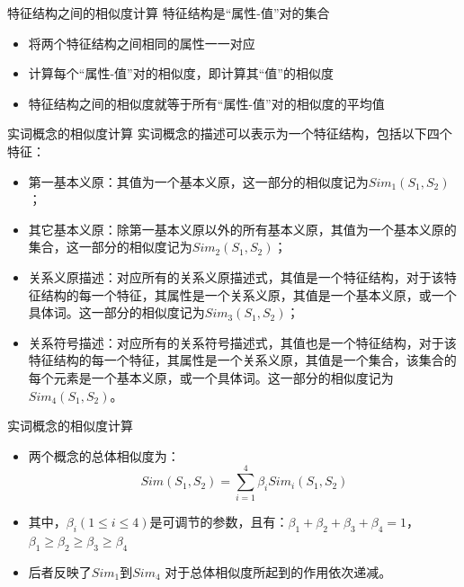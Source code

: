 \documentclass{beamer}
\begin{document}
    \begin{frame}{特征结构之间的相似度计算}
      特征结构是“属性-值”对的集合
      \begin{itemize}
        \item 将两个特征结构之间相同的属性一一对应
        \item 计算每个“属性-值”对的相似度，即计算其“值”的相似度
        \item 特征结构之间的相似度就等于所有“属性-值”对的相似度的平均值
      \end{itemize}
    \end{frame}

    \begin{frame}{实词概念的相似度计算}
      实词概念的描述可以表示为一个特征结构，包括以下四个特征：
      \begin{itemize}
        \item 第一基本义原：其值为一个基本义原，这一部分的相似度记为$Sim_1(S_1,S_2)$；
        \item 其它基本义原：除第一基本义原以外的所有基本义原，其值为一个基本义原的集合，这一部分的相似度记为$Sim_2(S_1,S_2)$；
        \item 关系义原描述：对应所有的关系义原描述式，其值是一个特征结构，对于该特征结构的每一个特征，其属性是一个关系义原，其值是一个基本义原，或一个具体词。这一部分的相似度记为$Sim_3(S_1,S_2)$；
        \item 关系符号描述：对应所有的关系符号描述式，其值也是一个特征结构，对于该特征结构的每一个特征，其属性是一个关系义原，其值是一个集合，该集合的每个元素是一个基本义原，或一个具体词。这一部分的相似度记为$Sim_4(S_1,S_2)$。 
    \end{itemize}
    \end{frame}

    \begin{frame}{实词概念的相似度计算}
      \begin{itemize}
        \item 两个概念的总体相似度为：
        \begin{equation}
          Sim(S_1, S_2) = \sum_{i=1}^4 {\beta}_i Sim_i(S_1, S_2)
        \end{equation}
        \item 其中，${\beta}_i (1 \leq i \leq 4)$是可调节的参数，且有：${\beta}_1+{\beta}_2+{\beta}_3+{\beta}_4=1$，${\beta}_1 \geq {\beta}_2 \geq {\beta}_3 \geq {\beta}_4$
        \item 后者反映了$Sim_1$到$Sim_4$ 对于总体相似度所起到的作用依次递减。
    \end{itemize}
    \end{frame}
\end{document}
